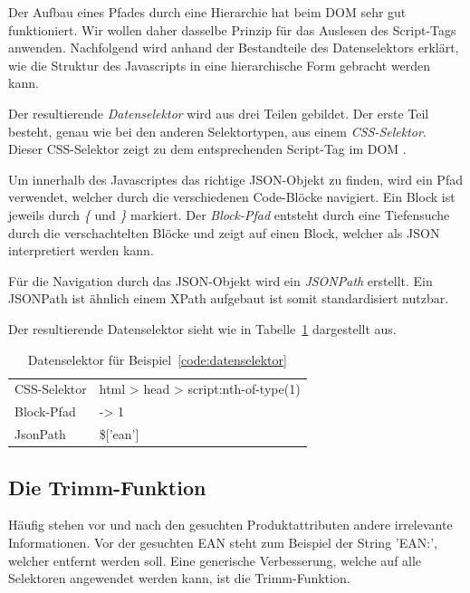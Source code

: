 Der Aufbau eines Pfades durch eine Hierarchie hat beim DOM sehr gut funktioniert.
Wir wollen daher dasselbe Prinzip für das Auslesen des Script-Tags anwenden.
Nachfolgend wird anhand der Bestandteile des Datenselektors erklärt, wie die Struktur des Javascripts in eine
hierarchische Form gebracht werden kann.

Der resultierende \textit{Datenselektor} wird aus drei Teilen gebildet.
Der erste Teil besteht, genau wie bei den anderen Selektortypen, aus einem \textit{CSS-Selektor}.
Dieser CSS-Selektor zeigt zu dem entsprechenden Script-Tag im DOM .

Um innerhalb des Javascriptes das richtige JSON-Objekt zu finden, wird ein Pfad verwendet, welcher durch die
verschiedenen Code-Blöcke navigiert.
Ein Block ist jeweils durch \textit{\{} und \textit{\}} markiert.
Der \textit{Block-Pfad} entsteht durch eine Tiefensuche durch die verschachtelten Blöcke und zeigt auf einen
Block, welcher als JSON interpretiert werden kann.

Für die Navigation durch das JSON-Objekt wird ein \textit{JSONPath} erstellt.
Ein JSONPath ist ähnlich einem XPath aufgebaut ist somit standardisiert nutzbar.

Der resultierende Datenselektor sieht wie in Tabelle~\ref{tab:datenselektor} dargestellt aus.

\begin{table}[h]
    \centering
    \begin{tabular}{ l | l }
        CSS-Selektor &  html > head > script:nth-of-type(1)\\
        Block-Pfad   &  -> 1\\
        JsonPath     &  \$['ean']
    \end{tabular}
    \caption{Datenselektor für Beispiel~\ref{code:datenselektor}}
    \label{tab:datenselektor}
\end{table}
\vspace{-0.5cm}

\subsection{Die Trimm-Funktion}
\label{subsec:trimming-funktion}

Häufig stehen vor und nach den gesuchten Produktattributen andere irrelevante Informationen.
Vor der gesuchten EAN steht zum Beispiel der String 'EAN:\textvisiblespace', welcher entfernt werden soll.
Eine generische Verbesserung, welche auf alle Selektoren angewendet werden kann, ist die Trimm-Funktion.

